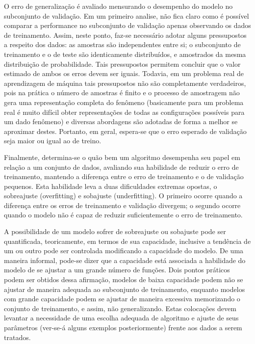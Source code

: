O erro de generalização é avaliado mensurando o desempenho do modelo no subconjunto de validação. Em um primeiro analise, não fica claro como é possível comparar a performance no subconjunto de validação apenas observando os dados de treinamento. Assim, neste ponto, faz-se necessário adotar alguns pressupostos a respeito dos dados: as amostras são independentes entre si; o subconjunto de treinamento e o de teste são identicamente distribuídos, e amostrados da mesma distribuição de probabilidade. Tais pressupostos permitem concluir que o valor estimado de ambos os erros devem ser iguais. Todavia, em um problema real de aprendizagem de máquina tais pressupostos não são completamente verdadeiros, pois na prática o número de amostras é finito e o processo de amostragem não gera uma representação completa do fenômeno (basicamente para um problema real é muito difícil obter representações de todas as configurações possíveis para um dado fenômeno) e diversas abordagens são adotadas de forma a melhor se aproximar destes. Portanto, em geral, espera-se que o erro esperado de validação seja maior ou igual ao de treino.

Finalmente, determina-se o quão bem um algoritmo desempenha seu papel em relação a um conjunto de dados, avaliando sua habilidade de reduzir o erro de treinamento, mantendo a diferença entre o erro de treinamento e o de validação pequenos. Esta habilidade leva a duas dificuldades extremas opostas, o sobreajuste (overfitting) e sobajuste (underfitting). O primeiro ocorre quando a diferença entre os erros de treinamento e validação divergem; o segundo ocorre quando o modelo não é capaz de reduzir suficientemente o erro de treinamento.

A possibilidade de um modelo sofrer de sobreajuste ou sobajuste pode ser quantificada, teoricamente, em termos de sua capacidade, inclusive a tendência de um ou outro pode ser controlada modificando a capacidade do modelo. De uma maneira informal, pode-se dizer que a capacidade está associada a habilidade do modelo de se ajustar a um grande número de funções. Dois pontos práticos podem ser obtidos dessa afirmação, modelos de baixa capacidade podem não se ajustar de maneira adequada ao subconjunto de treinamento, enquanto modelos com grande capacidade podem se ajustar de maneira excessiva memorizando o conjunto de treinamento, e assim, não generalizando. Estas colocações devem levantar a necessidade de uma escolha adequada de algoritmo e ajuste de seus parâmetros (ver-se-á alguns exemplos posteriormente) frente aos dados a serem tratados.

